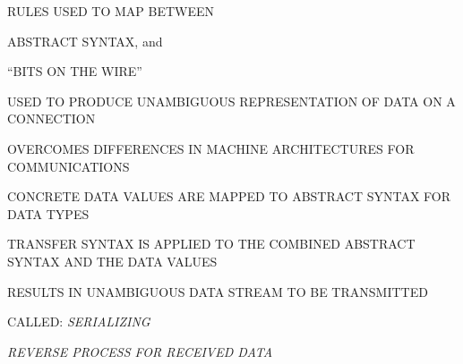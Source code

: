 \begin{bwslide}

\begin{nrtc}
\item	RULES USED TO MAP BETWEEN
	\begin{nrtc}
	\item	ABSTRACT SYNTAX, and
	\item	``BITS ON THE WIRE''
	\end{nrtc}
\item	USED TO PRODUCE UNAMBIGUOUS REPRESENTATION OF DATA ON A CONNECTION
\item	OVERCOMES DIFFERENCES IN MACHINE ARCHITECTURES FOR COMMUNICATIONS
\end{nrtc}
\end{bwslide}


\begin{bwslide}

\begin{nrtc}
\item	CONCRETE DATA VALUES ARE MAPPED TO ABSTRACT SYNTAX FOR DATA TYPES
\item	TRANSFER SYNTAX IS APPLIED TO THE COMBINED ABSTRACT SYNTAX AND
	THE DATA VALUES
\item	RESULTS IN UNAMBIGUOUS DATA STREAM TO BE TRANSMITTED
	\begin{nrtc}
	\item	CALLED: {\em SERIALIZING}
	\end{nrtc}
\item	{\em REVERSE PROCESS FOR RECEIVED DATA}
\end{nrtc}
\end{bwslide}


%


%
%
%


